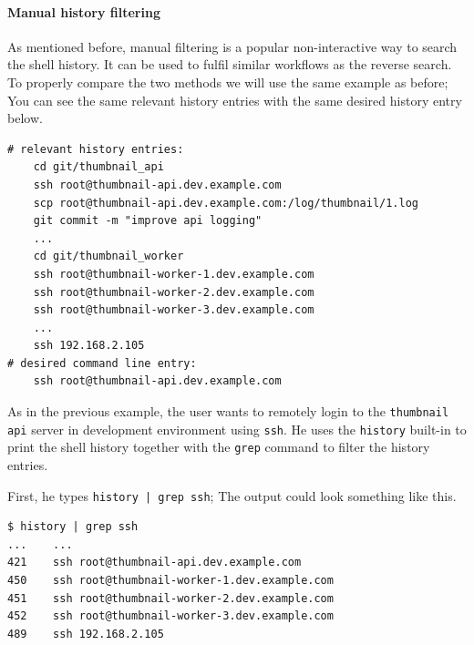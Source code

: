 




\paragraph{Manual history filtering}

As mentioned before, manual filtering is a popular non-interactive way to search the shell history. It can be used to fulfil similar workflows as the reverse search. To properly compare the two methods we will use the same example as before; You can see the same relevant history entries with the same desired history entry below.


\begin{verbatim}
# relevant history entries:
    cd git/thumbnail_api
    ssh root@thumbnail-api.dev.example.com
    scp root@thumbnail-api.dev.example.com:/log/thumbnail/1.log
    git commit -m "improve api logging"
    ...
    cd git/thumbnail_worker
    ssh root@thumbnail-worker-1.dev.example.com
    ssh root@thumbnail-worker-2.dev.example.com
    ssh root@thumbnail-worker-3.dev.example.com
    ...
    ssh 192.168.2.105
# desired command line entry:
    ssh root@thumbnail-api.dev.example.com
\end{verbatim}

As in the previous example, the user wants to remotely login to the \verb|thumbnail| \verb|api| server in development environment using \verb|ssh|. He uses the \verb|history| built-in to print the shell history together with the \verb|grep| command to filter the history entries.

First, he types \verb#history | grep ssh#; The output could look something like this.

\begin{verbatim}
$ history | grep ssh
...    ...
421    ssh root@thumbnail-api.dev.example.com
450    ssh root@thumbnail-worker-1.dev.example.com
451    ssh root@thumbnail-worker-2.dev.example.com
452    ssh root@thumbnail-worker-3.dev.example.com
489    ssh 192.168.2.105
\end{verbatim}


